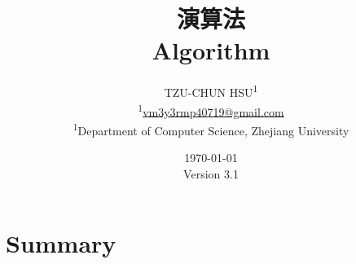 \documentclass[12pt]{article}
\newcommand{\ver}{\textmd{Version} 3.1} %
\begin{document}
\title{\Huge{\textbf{演算法}} \\
	\LARGE{\textbf{Algorithm}}
}
\newcommand*{\affaddr}[1]{#1}
\newcommand*{\affmark}[1][*]{\textsuperscript{#1}}
\author{
	TZU-CHUN HSU\affmark[1] \\
	\affmark[1]\href{mailto:vm3y3rmp40719@gmail.com}{vm3y3rmp40719@gmail.com} \\
	\affaddr{\affmark[1]Department of Computer Science, Zhejiang University
	}
}

\date{\mbox{}\vfill\today\\ \ver}

\maketitle
\pagebreak



\begingroup
\section{Summary}
\begin{enumerate}
\let\clearpage\relax






\end{enumerate}
\endgroup

\end{document}
